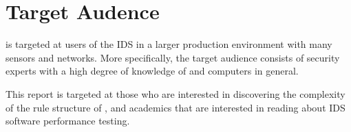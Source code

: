 \section{Target Audence}
\snowman{} is targeted at users of the \snort{} IDS
in a larger production environment with many sensors and networks.
More specifically, the target audience consists of security experts
with a high degree of knowledge of \snort{} and computers in general.

This report is targeted at those who are interested in discovering the
complexity of the rule structure of \snort{}, and academics that are
interested in reading about IDS software performance testing.